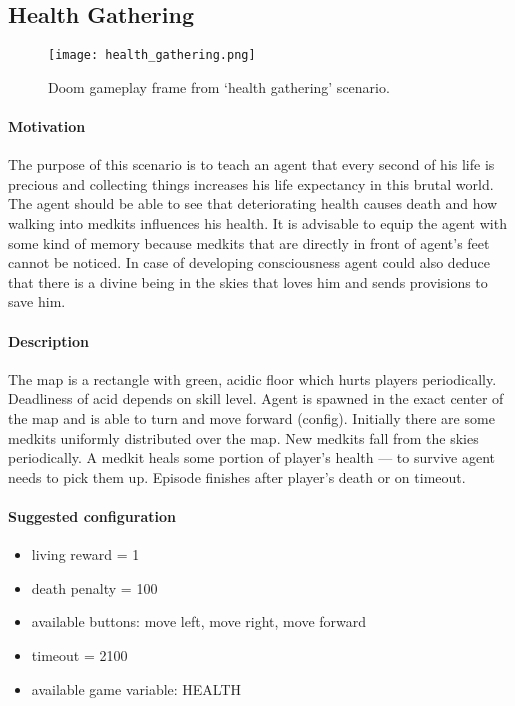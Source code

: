 	\subsection{Health Gathering}
		\begin{figure}
			\centering
			\texttt{[image: health\_gathering.png]}
			\caption{Doom gameplay frame from `health gathering' scenario.}\label{fig:health_gathering}
		\end{figure}
		\paragraph{Motivation}
			The purpose of this scenario is to teach an agent that every second of his life is precious and collecting things increases his life expectancy in this brutal world. The agent should be able to see that deteriorating health causes death and how walking into medkits influences his health. It is advisable to equip the agent with some kind of memory because medkits that are directly in front of agent's feet cannot be noticed. In case of developing consciousness agent could also deduce that there is a divine being in the skies that loves him and sends provisions to save him.

		\paragraph{Description}
			The map is a rectangle with green, acidic floor which hurts players periodically. Deadliness of acid depends on skill level. Agent is spawned in the exact center of the map and is able to turn and move forward (config).  Initially there are some medkits uniformly distributed over the map. New medkits fall from the skies periodically. A medkit heals some portion of player's health --- to survive agent needs to pick them up. Episode finishes after player's death or on timeout.

		\paragraph{Suggested configuration}
		\begin{itemize}
			\item living reward = 1
			\item death penalty = 100
			\item available buttons: move left, move right, move forward
			\item timeout = 2100
			\item available game variable: HEALTH
		\end{itemize}
	\newpage

